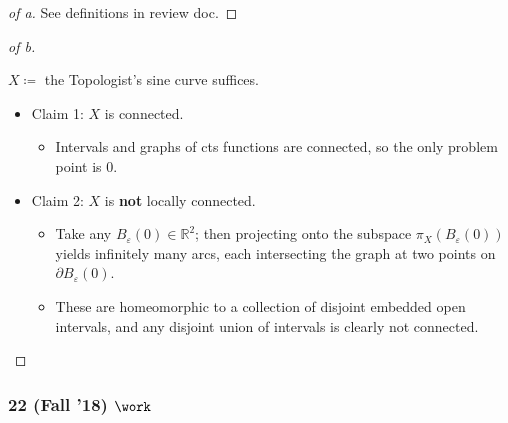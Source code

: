\begin{solution}

\envlist

\begin{proof}[of a]

See definitions in review doc.

\end{proof}

\begin{proof}[of b]

\begin{claim}

\(X\coloneqq\) the Topologist's sine curve suffices.

\end{claim}

\begin{itemize}
\tightlist
\item
  Claim 1: \(X\) is connected.

  \begin{itemize}
  \tightlist
  \item
    Intervals and graphs of cts functions are connected, so the only
    problem point is \(0\).
  \end{itemize}
\item
  Claim 2: \(X\) is \textbf{not} locally connected.

  \begin{itemize}
  \tightlist
  \item
    Take any \(B_\varepsilon(0) \in {\mathbb{R}}^2\); then projecting
    onto the subspace \(\pi_X(B_\varepsilon(0))\) yields infinitely many
    arcs, each intersecting the graph at two points on
    \({{\partial}}B_\varepsilon(0)\).
  \item
    These are homeomorphic to a collection of disjoint embedded open
    intervals, and any disjoint union of intervals is clearly not
    connected.
  \end{itemize}
\end{itemize}

\end{proof}

\end{solution}

\hypertarget{fall-18-work}{%
\subsubsection{\texorpdfstring{22 (Fall '18)
\(\work\)}{22 (Fall '18) \textbackslash work}}\label{fall-18-work}}

